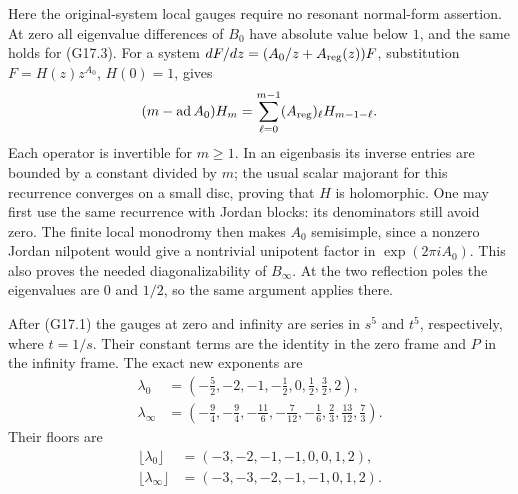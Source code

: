 Here the original-system local gauges require no resonant
normal-form assertion.  At zero all eigenvalue differences of $B_0$
have absolute value below $1$, and the same holds for (G17.3).
For a system $dF/dz=(A_0/z+A_{\rm reg}(z))F$, substitution
$F=H(z)z^{A_0}$, $H(0)=1$, gives
\[
 (m-\operatorname{ad}A_0)H_m
       =\sum_{\ell=0}^{m-1}(A_{\rm reg})_\ell H_{m-1-\ell}.
\]
Each operator is invertible for $m\ge1$.  In an eigenbasis its
inverse entries are bounded by a constant divided by $m$;
the usual scalar majorant for this recurrence converges on a
small disc, proving that $H$ is holomorphic.
One may first use the same recurrence with Jordan blocks:
its denominators still avoid zero.  The finite local monodromy
then makes $A_0$ semisimple, since a nonzero Jordan nilpotent would
give a nontrivial unipotent factor in $\exp(2\pi iA_0)$.
This also proves the needed diagonalizability of $B_\infty$.
At the two reflection poles the eigenvalues are $0$ and $1/2$,
so the same argument applies there.

After (G17.1) the gauges at zero and infinity are series in $s^5$
and $t^5$, respectively, where $t=1/s$.  Their constant terms are
the identity in the zero frame and $P$ in the infinity frame.
The exact new exponents are
\begin{equation}
 \begin{aligned}
 \lambda_0&=
 \left(-\frac52,-2,-1,-\frac12,0,\frac12,\frac32,2\right),
 \\
 \lambda_\infty&=
 \left(-\frac94,-\frac94,-\frac{11}6,-\frac7{12},
                         -\frac16,\frac23,\frac{13}{12},\frac73\right).
 \end{aligned}                                          \tag{G17.4}
\end{equation}
Their floors are
\begin{equation}
 \begin{aligned}
 \lfloor\lambda_0\rfloor&=(-3,-2,-1,-1,0,0,1,2),\\
 \lfloor\lambda_\infty\rfloor&=(-3,-3,-2,-1,-1,0,1,2).
 \end{aligned}                                          \tag{G17.5}
\end{equation}

